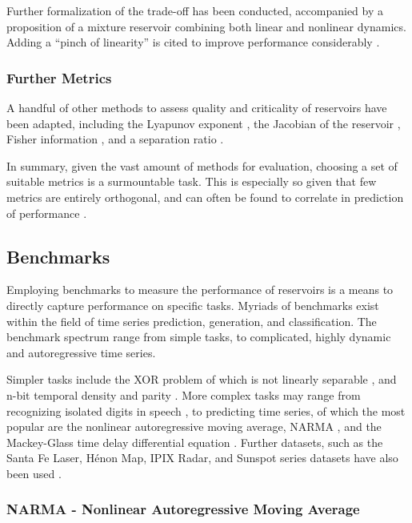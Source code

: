 Further formalization of the trade-off has been conducted, accompanied by a
proposition of a mixture reservoir combining both linear and nonlinear
dynamics. Adding a ``pinch of linearity'' is cited to improve performance
considerably \cite{inubushi_reservoir_2017}.

\subsubsection{Further Metrics}

A handful of other methods to assess quality and criticality of reservoirs have
been adapted, including the Lyapunov exponent
\cite{verstraeten_experimental_2007}, the Jacobian of the reservoir
\cite{alippi_quantification_2009}, Fisher information
\cite{livi_determination_2018}, and a separation ratio
\cite{gibbons_unifying_2010}.

In summary, given the vast amount of methods for evaluation, choosing a set of
suitable metrics is a surmountable task. This is especially so given that few
metrics are entirely orthogonal, and can often be found to correlate in
prediction of performance \cite{chrol-cannon_correlation_2014}.

\subsection{Benchmarks}

Employing benchmarks to measure the performance of reservoirs is a means to
directly capture performance on specific tasks. Myriads of benchmarks exist
within the field of time series prediction, generation, and classification. The
benchmark spectrum range from simple tasks, to complicated, highly dynamic and
autoregressive time series.

Simpler tasks include the XOR problem of which is not linearly separable
\cite{goos_pattern_2003}, and n-bit temporal density and parity
\cite{bertschinger_real-time_2004}. More complex tasks may range from
recognizing isolated digits in speech \cite{verstraeten_isolated_2005}, to
predicting time series, of which the most popular are the nonlinear
autoregressive moving average, NARMA \cite{atiya_new_2000}, and the Mackey-Glass
time delay differential equation \cite{mackey_oscillation_1977}. Further
datasets, such as the Santa Fe Laser, Hénon Map, IPIX Radar, and Sunspot series
datasets have also been used \cite{rodan_minimum_2011}.

\subsubsection{NARMA - Nonlinear Autoregressive Moving Average}

